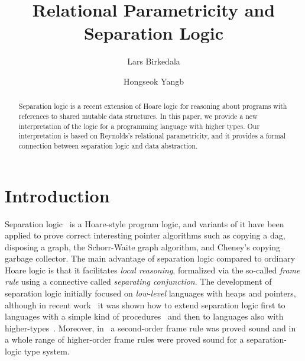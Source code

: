 \documentclass{LMCS}
\begin{document}
\title[Relational Parametricity and Separation Logic]
{Relational Parametricity and Separation Logic}

\author[L.~Birkedal]{Lars Birkedal\rsuper a}
\address{{\lsuper a}IT University of Copenhagen, Denmark}

\author[H.~Yang]{Hongseok Yang\rsuper b}
\address{{\lsuper b}Queen Mary, University of London, UK}


\begin{abstract}
  Separation logic is a recent extension of Hoare logic for reasoning about
  programs with references to shared mutable data structures.  In this paper, we
  provide a new interpretation of the logic for a programming language with
  higher types. Our interpretation is based on Reynolds's relational
  parametricity, and it provides a formal connection between separation
  logic and data abstraction.
\end{abstract}

\maketitle

\section{Introduction}

Separation
logic~\cite{reynolds02,ohearn-reynolds-yang01,birkedal-torpsmith-reynolds-popl04}
is a Hoare-style program logic, and variants of it have been applied
to prove correct interesting pointer algorithms such as copying a dag,
disposing a graph, the Schorr-Waite graph algorithm, and Cheney's
copying garbage collector.  The main advantage of separation logic
compared to ordinary Hoare logic is that it facilitates \emph{local
  reasoning}, formalized via the so-called \emph{frame rule} using a
connective called \emph{separating conjunction}.  The development of
separation logic initially focused on \emph{low-level} languages with
heaps and pointers, although in recent
work~\cite{yang-ohearn-reynolds-popl04,birkedal-torpsmith-yang-lics05} 
it was shown how to extend
separation logic first to
languages with a simple kind of
procedures~\cite{yang-ohearn-reynolds-popl04}
and then to languages also with
higher-types~\cite{birkedal-torpsmith-yang-lics05}.
Moreover, in~\cite{yang-ohearn-reynolds-popl04} a second-order frame rule
was proved sound and in~\cite{birkedal-torpsmith-yang-lics05} a whole range
of higher-order frame rules were proved sound for a separation-logic type
system. 
\end{document}
